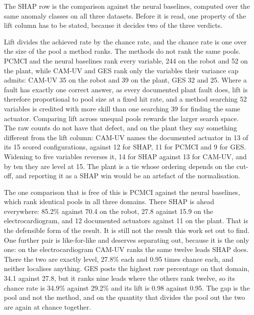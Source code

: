 


The SHAP row is the comparison against the neural baselines, computed over the
same anomaly classes on all three datasets. Before it is read, one property of
the lift column has to be stated, because it decides two of the three verdicts.

Lift divides the achieved rate by the chance rate, and the chance rate is one
over the size of the pool a method ranks. The methods do not rank the same
pools. PCMCI and the neural baselines rank every variable, 244 on the robot and
52 on the plant, while CAM-UV and GES rank only the variables their variance cap
admits: CAM-UV 35 on the robot and 39 on the plant, GES 32 and 25. Where a fault has exactly one correct
answer, as every documented plant fault does, lift is therefore proportional to
pool size at a fixed hit rate, and a method searching 52 variables is credited
with more skill than one searching 39 for finding the same actuator. Comparing
lift across unequal pools rewards the larger search space. The raw counts do not
have that defect, and on the plant they say something different from the lift
column: CAM-UV names the documented actuator in 13 of its 15 scored
configurations, against 12 for SHAP, 11 for PCMCI and 9 for GES. Widening to
five variables reverses it, 14 for SHAP against 13 for CAM-UV, and by ten they
are level at 15. The plant is a tie whose ordering depends on the cut-off, and
reporting it as a SHAP win would be an artefact of the normalisation.

The one comparison that is free of this is PCMCI against the neural baselines,
which rank identical pools in all three domains. There SHAP is ahead
everywhere: 85.2\% against 70.4 on the robot, 27.8 against 15.9 on the
electrocardiogram, and 12 documented actuators against 11 on the plant. That is the defensible form of the result. It is still not the result this work set out to find. One further pair is like-for-like and deserves separating out, because it is the only one: on the electrocardiogram CAM-UV ranks the same twelve leads SHAP does.
There the two are exactly level, 27.8\% each and 0.95 times chance each, and
neither localises anything. GES posts the highest raw percentage on that domain,
34.1 against 27.8, but it ranks nine leads where the others rank twelve, so its
chance rate is 34.9\% against 29.2\% and its lift is 0.98 against 0.95. The gap
is the pool and not the method, and on the quantity that divides the pool out the
two are again at chance together.

